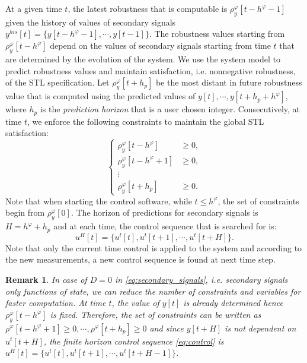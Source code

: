 \documentclass[letterpaper, 10 pt, conference]{ieeeconf}
\newtheorem{remark}{Remark}
\begin{document}
At a given time $t$, the latest robustness that is computable is $\rho_y^\varphi[t-h^\varphi-1]$ given the history of values of secondary signals $y^{his}[t]=\{y[t-h^\varphi-1], \cdots,y[t-1] \}$. The robustness values starting from $\rho_y^\varphi[t-h^\varphi]$ depend on the values of secondary signals starting from time $t$ that are determined by the evolution of the system. We use the system model to predict robustness values and maintain satisfaction, i.e. nonnegative robustness, of the STL specification. Let $\rho_y^\varphi[t+h_p]$ be the most distant in future robustness value that is computed using the  predicted values of $y[t],\cdots,y[t+h_p+h^\varphi]$, where $h_p$ is  the \emph{prediction horizon} that is a user chosen integer. Consecutively, at time $t$, we enforce the following constraints to maintain the global STL satisfaction:
\begin{equation}
\label{eq:constraints}
\left \{
\begin{array}{cc}
\rho_y^\varphi[t-h^\varphi] & \geq 0, \\
\rho_y^\varphi[t-h^\varphi+1] & \geq 0, \\
\vdots & \\ 
\rho_y^\varphi[t+h_p] & \geq 0.
\end{array}
\right.
\end{equation}
Note that when starting the control software, while $t\le h^\varphi$, the set of constraints begin from $\rho_y^\varphi[0]$.
The horizon of predictions for secondary signals is $H=h^\varphi+h_p$ and at each time, the control sequence that is searched for is:
\begin{equation}
\label{eq:control}
u^H[t]=\{ u^t[t],u^{t}[t+1],\cdots,u^t[t+H] \}.
\end{equation}
Note that only the current time control is applied to the system and according to the new measurements, a new control sequence is found at next time step.  
\begin{remark}
In case of $D=0$ in \eqref{eq:secondary_signals}, i.e. secondary signals only functions of state, we can reduce the number of constraints and variables for faster computation. At time $t$, the value of $y[t]$ is already determined hence $\rho^\varphi_y[t-h^\varphi]$ is fixed. Therefore, the set of constraints can be written as $\rho^\varphi[t-h^\varphi+1] \geq 0, \cdots, \rho^\varphi[t+h_p]  \geq 0$ and since $y[t+H]$ is not dependent on $u^t[t+H]$, the finite horizon control sequence \eqref{eq:control} is $u^H[t]=\{u^t[t],u^t[t+1],\cdots,u^t[t+H-1]\}$. \end{remark}
\end{document}
